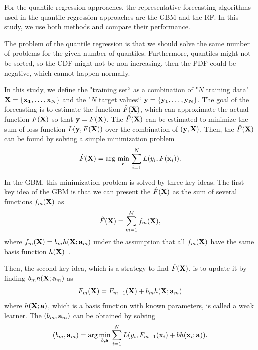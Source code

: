 \documentclass[journal]{IEEEtran} %
\begin{document}
For the quantile regression approaches, the representative forecasting algorithms used in the quantile regression approaches are the GBM and the RF. In this study, we use both methods and compare their performance.

The problem of the quantile regression is that we should solve the same number of problems for the given number of quantiles. Furthermore, quantiles might not be sorted, so the CDF might not be non-increasing, then the PDF could be negative, which cannot happen normally.



In this study, we define the "training set`` as a combination of "$N$ training data" $ \bf{X}=\left\{ {{{\bf{x}}_1}, \ldots ,{{\bf{x}}_N}} \right\}$ and the "$N$ target values`` $\bf{y} = \left\{ {{y_1}, \ldots ,{y_N}} \right\}$. The goal of the forecasting is to estimate the function $\hat{F}(\bf{X})$, which can approximate the actual function $F(\bf{X})$ so that ${\bf{y}} = F(\bf{X})$. The $\hat{F}(\bf{X})$ can be estimated to minimize the sum of loss function $L({\bf{y}}, F(\bf{X}) )$ over the combination of $( {\bf{y}}, {\bf{X}})$. Then, the $\hat{F}(\bf{X})$ can be found by solving a simple minimization problem
\begin{equation}
\label{GBMobject}
\hat F({\bf{X}}) = \arg \,\mathop {\min }\limits_F \,\sum\limits_{i = 1}^N {L({y_i},F({{\bf{x}}_i}))}.
\end{equation}

In the GBM, this minimization problem is solved by three key ideas.
The first key idea of the GBM is that we can present the $\hat{F}(\bf{X})$ as the sum of several functions $f_m({\bf{X}})$ as 
\begin{equation}
\label{SubFunctions}
\hat F({\bf{X}}) = \sum\limits_{m = 1}^M {f_m({\bf{X}})}, 
\end{equation}
where $f_m({\bf{X}})= b_m h({\bf{X}}; {\bf{a}}_m)$ under the assumption that all $f_m({\bf{X}})$ have the same basis function $h({\bf{X}})$~\cite{Tibshirani}.


Then, the second key idea, which is a strategy to find $\hat F({\bf{X}})$, is to update it by finding $b_m h({\bf{X}}; {\bf{a}}_m)$ as
\begin{equation}
\label{Update}
{F_m}({\bf{X}}) = {F_{m - 1}}({\bf{X}}) + {b_m}h({\bf{X}};{{\bf{a}}_m})
\end{equation}
where $h({\bf{X}};{{\bf{a}}})$, which is a basis function with known parameters, is called a weak learner.
The $(b_m,{\bf{a}}_m)$ can be obtained by solving
\begin{equation}
\label{Parametric}
({b_m},{{\bf{a}}_m}) = \arg \mathop {\min }\limits_{b,{\bf{a}}} \sum\limits_{i = 1}^N {L({y_i},{F_{m - 1}}({{\bf{x}}_i}) + bh({{\bf{x}}_i};{\bf{a}}))}.
\end{equation}
\end{document}
